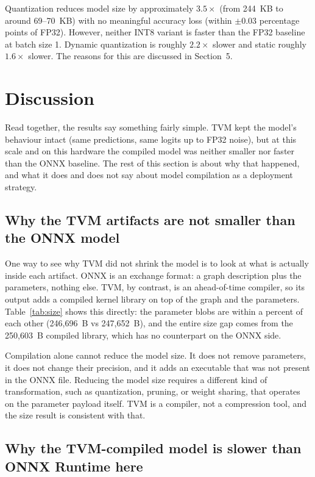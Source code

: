 \documentclass[fleqn,10pt]{olplainarticle}
\begin{document}
Quantization reduces model size by approximately $3.5\times$ (from 244~KB to around 69--70~KB) with no meaningful accuracy loss (within $\pm 0.03$ percentage points of FP32). However, neither INT8 variant is faster than the FP32 baseline at batch size 1. Dynamic quantization is roughly $2.2\times$ slower and static roughly $1.6\times$ slower. The reasons for this are discussed in Section~5.

\section{Discussion}

Read together, the results say something fairly simple. TVM kept the model's behaviour intact (same predictions, same logits up to FP32 noise), but at this scale and on this hardware the compiled model was neither smaller nor faster than the ONNX baseline. The rest of this section is about why that happened, and what it does and does not say about model compilation as a deployment strategy.

\subsection{Why the TVM artifacts are not smaller than the ONNX model}

One way to see why TVM did not shrink the model is to look at what is actually inside each artifact. ONNX is an exchange format: a graph description plus the parameters, nothing else. TVM, by contrast, is an ahead-of-time compiler, so its output adds a compiled kernel library on top of the graph and the parameters. Table~\ref{tab:size} shows this directly: the parameter blobs are within a percent of each other (246{,}696~B vs 247{,}652~B), and the entire size gap comes from the 250{,}603~B compiled library, which has no counterpart on the ONNX side.

Compilation alone cannot reduce the model size. It does not remove parameters, it does not change their precision, and it adds an executable that was not present in the ONNX file. Reducing the model size requires a different kind of transformation, such as quantization, pruning, or weight sharing, that operates on the parameter payload itself. TVM is a compiler, not a compression tool, and the size result is consistent with that.

\subsection{Why the TVM-compiled model is slower than ONNX Runtime here}
\end{document}
